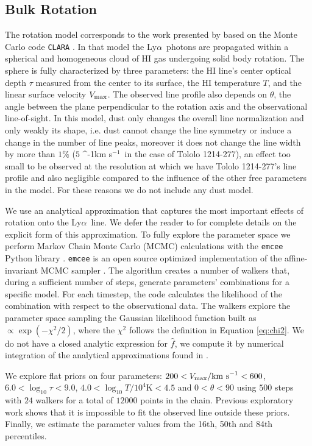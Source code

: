 \documentclass[a4paper,fleqn,usenatbib]{mnras}
\newcommand{\tol}{Tololo 1214-277}
\newcommand{\lya}{\ifmmode{{\rm Ly}\alpha}\else Ly$\alpha$\ \fi}
\newcommand{\kms}{\ifmmode\mathrm{km\ s}^{-1}\else km s$^{-1}$\fi}
\begin{document}
\subsection{Bulk Rotation}

The rotation model corresponds to the work presented by
\cite{GaravitoCamargo2014} based on the Monte Carlo code
\texttt{CLARA} \citep{CLARA}. 
In that model the \lya photons are propagated 
within a spherical and homogeneous cloud of HI gas undergoing solid
body rotation.
The sphere is fully characterized by three parameters: the HI line's
center optical  depth $\tau$ measured from the center to its surface, the HI
temperature $T$, and the linear surface velocity $V_{\rm max}$.  
The observed line profile also depends on $\theta$,  the angle between the plane
perpendicular to the rotation axis and the observational
line-of-sight.  
In this model, dust only changes the overall line
normalization and only weakly its shape, i.e. 
dust cannot change the line symmetry or induce a change in the number
of line peaks, moreover it does not change the line width by more than
$1\%$ ($5$ \kms\ in the case of \tol), an effect too small to be
observed at the resolution at which we have \tol's line profile and
also negligible compared to the influence of the other free parameters in the model.
For these reasons we do not include any dust model. 

We use an analytical approximation that captures the most important
effects of rotation onto the \lya line. 
We defer the reader to \citet{GaravitoCamargo2014} for complete
details on the explicit form of this approximation.
To fully explore the parameter space we perform Markov Chain Monte
Carlo (MCMC) calculations with the \texttt{emcee} Python library
\citep{2013PASP..125..306F}. \texttt{emcee} is an open source
optimized implementation of the affine-invariant MCMC sampler
\citep{goodman2010ensemble}.  
The algorithm creates a number of walkers that,
during a sufficient number of steps, generate parameters' combinations
for a specific model.
For each timestep, the code calculates the likelihood of the
combination with respect to the observational data.
The walkers explore the parameter space sampling the Gaussian likelihood
function built as $\propto \exp(-\chi^2/2)$, where the $\chi^2$ follows
the definition in Equation \ref{eq:chi2}. 
We do not have a closed analytic expression for $\hat{f}$, we compute it
by numerical integration of the analytical approximations found in
\citet{GaravitoCamargo2014}.  

We explore flat priors on four parameters: $200<V_{\rm
  max}/\mathrm{km\ s}^{-1} <600$,   $6.0<\log_{10}\tau<9.0$,
$4.0<\log_{10} T/10^4\mathrm{K}< 4.5$ and $0<\theta<90$ using $500$
steps with $24$ walkers for a total of $12000$ points in the chain.
Previous exploratory work shows that it is impossible to fit the
observed line outside these priors.
Finally, we estimate the parameter values from the 16th, 50th and 84th
percentiles. 
\end{document}
